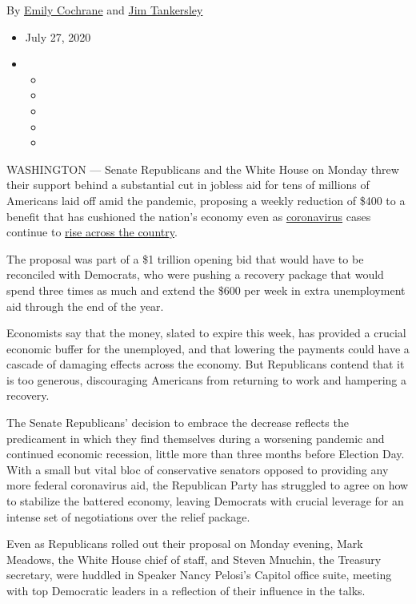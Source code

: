 By \href{https://www.nytimes.com/by/emily-cochrane}{Emily Cochrane} and
\href{https://www.nytimes.com/by/jim-tankersley}{Jim Tankersley}

\begin{itemize}
\item
  July 27, 2020
\item
  \begin{itemize}
  \item
  \item
  \item
  \item
  \item
  \end{itemize}
\end{itemize}

WASHINGTON --- Senate Republicans and the White House on Monday threw
their support behind a substantial cut in jobless aid for tens of
millions of Americans laid off amid the pandemic, proposing a weekly
reduction of \$400 to a benefit that has cushioned the nation's economy
even as
\href{https://www.nytimes.com/2020/07/28/world/coronavirus-covid-19.html}{coronavirus}
cases continue to
\href{https://www.nytimes.com/interactive/2020/us/coronavirus-us-cases.html}{rise
across the country}.

The proposal was part of a \$1 trillion opening bid that would have to
be reconciled with Democrats, who were pushing a recovery package that
would spend three times as much and extend the \$600 per week in extra
unemployment aid through the end of the year.

Economists say that the money, slated to expire this week, has provided
a crucial economic buffer for the unemployed, and that lowering the
payments could have a cascade of damaging effects across the economy.
But Republicans contend that it is too generous, discouraging Americans
from returning to work and hampering a recovery.

The Senate Republicans' decision to embrace the decrease reflects the
predicament in which they find themselves during a worsening pandemic
and continued economic recession, little more than three months before
Election Day. With a small but vital bloc of conservative senators
opposed to providing any more federal coronavirus aid, the Republican
Party has struggled to agree on how to stabilize the battered economy,
leaving Democrats with crucial leverage for an intense set of
negotiations over the relief package.

Even as Republicans rolled out their proposal on Monday evening, Mark
Meadows, the White House chief of staff, and Steven Mnuchin, the
Treasury secretary, were huddled in Speaker Nancy Pelosi's Capitol
office suite, meeting with top Democratic leaders in a reflection of
their influence in the talks.

